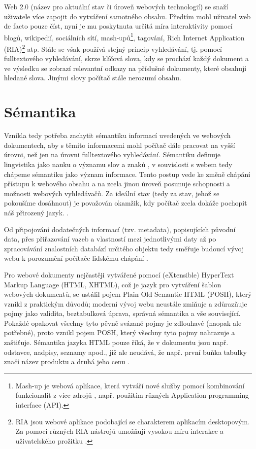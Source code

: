 Web 2.0 (název pro aktuální stav či úroveň webových technologií) se snaží uživatele více zapojit do vytváření samotného obsahu. Předtím mohl uživatel web de facto pouze číst, nyní je mu poskytnuta určitá míra interaktivity pomocí blogů, wikipedií, sociálních sítí, mash-upů\footnote{Mash-up je webová aplikace, která vytváří nové služby pomocí kombinování funkcionalit z více zdrojů \cite{mashup}, např. použitím různých Application programming interface (API).}, tagování, Rich Internet Application (RIA)\footnote{RIA jsou webové aplikace podobající se charakterem aplikacím desktopovým. Za pomoci různých RIA nástrojů umožňují vysokou míru interakce a uživatelského prožitku \cite{ria}.} atp.
Stále se však používá stejný princip vyhledávání, tj. pomocí fulltextového vyhledávání, skrze klíčová slova, kdy se prochází každý dokument a ve výsledku se zobrazí relevantní odkazy na příslušné dokumenty, které obsahují hledané slova. Jinými slovy počítač stále nerozumí obsahu.

\section{Sémantika}

Vznikla tedy potřeba zachytit sémantiku informací uvedených ve webových dokumentech, aby s těmito informacemi mohl počítač dále pracovat na vyšší úrovni, než jen na úrovni fulltextového vyhledávání. 
Sémantiku definuje lingvistika jako nauku o významu slov a znaků \cite{semantics}, v souvislosti s webem tedy chápeme sémantiku jako význam informace.
Tento postup vede ke změně chápání přístupu k webového obsahu a na zcela jinou úroveň posunuje schopnosti a možnosti webových vyhledávačů. Za ideální stav (tedy za stav, jehož se pokoušíme dosáhnout) je považován okamžik, kdy počítač zcela dokáže pochopit náš přirozený jazyk. \cite{europen}.

Od připojování dodatečných informací (tzv. metadata), popisujících původní data, přes přiřazování vazeb a vlastností mezi jednotlivými daty až po zpracovávání znalostních databází určitého objektu tedy směřuje budoucí vývoj webu k porozumění počítače lidskému chápání \cite{web30}.

Pro webové dokumenty nejčastěji vytvářené pomocí (eXtensible) HyperText Markup Language (HTML, XHTML), což je jazyk pro vytváření šablon webových dokumentů, se ustálil pojem Plain Old Semantic HTML (POSH), který vznikl z praktickým důvodů; moderní vývoj webu neustále zmiňuje a zdůrazňuje pojmy jako validita, beztabulková úprava, správná sémantika a vše související. Pokaždé opakovat všechny tyto pěvně svázané pojmy je zdlouhavé (naopak ale potřebné), proto vznikl pojem POSH, který všechny tyto pojmy nahrazuje a zaštiťuje. \cite{posh}
Sémantika jazyka HTML pouze říká, že v dokumentu jsou např. odstavce, nadpisy, seznamy apod., již ale neudává, že např. první buňka tabulky značí název produktu a druhá jeho cenu \cite{europen}.

